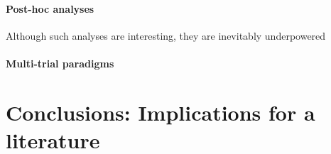 \documentclass[man,noapacite]{apa2}
\begin{document}
\paragraph{Post-hoc analyses}

Although such analyses are interesting, they are inevitably underpowered 

\paragraph{Multi-trial paradigms}


\section{Conclusions: Implications for a literature}



\end{document}
